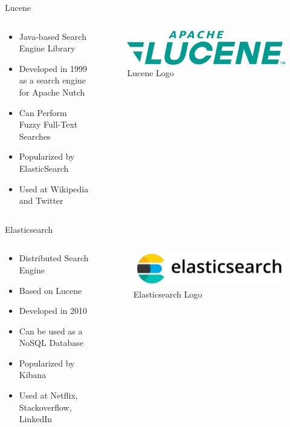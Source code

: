 \documentclass[compress,aspectratio=169]{beamer}
\begin{document}
\begin{frame}{Lucene}
\begin{columns}[T]
\begin{column}{0.5\textwidth}
\begin{itemize}
  \item Java-based Search Engine Library
  \item Developed in 1999 as a search engine for Apache Nutch
  \item Can Perform Fuzzy Full-Text Searches
  \item Popularized by ElasticSearch
  \item Used at Wikipedia and Twitter
\end{itemize}
\end{column}
\begin{column}{0.5\textwidth}
\begin{figure}
  \includegraphics[width=\textwidth]{lucene.png}
  \caption{Lucene Logo}
\end{figure}
\end{column}
\end{columns}
\end{frame}

\begin{frame}{Elasticsearch}
\begin{columns}[T]
\begin{column}{0.5\textwidth}
\begin{itemize}
  \item Distributed Search Engine
  \item Based on Lucene
  \item Developed in 2010
  \item Can be used as a NoSQL Database
  \item Popularized by Kibana
  \item Used at Netflix, Stackoverflow, LinkedIn
\end{itemize}
\end{column}
\begin{column}{0.5\textwidth}
\begin{figure}
  \includegraphics[width=\textwidth]{elasticsearch.png}
  \caption{Elasticsearch Logo}
\end{figure}
\end{column}
\end{columns}
\end{frame}
\end{document}
